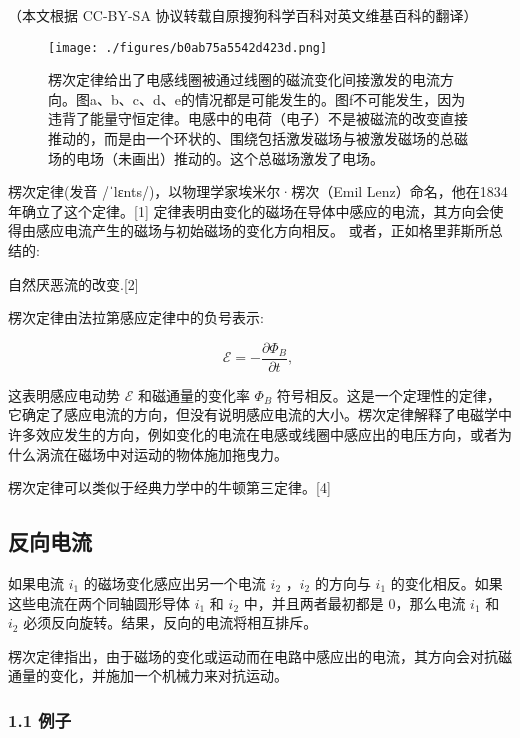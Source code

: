 
（本文根据 CC-BY-SA 协议转载自原搜狗科学百科对英文维基百科的翻译）

\begin{figure}[ht]
\centering
\texttt{[image: ./figures/b0ab75a5542d423d.png]}
\caption{楞次定律给出了电感线圈被通过线圈的磁流变化间接激发的电流方向。图a、b、c、d、e的情况都是可能发生的。图f不可能发生，因为违背了能量守恒定律。电感中的电荷（电子）不是被磁流的改变直接推动的，而是由一个环状的、围绕包括激发磁场与被激发磁场的总磁场的电场（未画出）推动的。这个总磁场激发了电场。} \label{fig_LCDL_1}
\end{figure}

楞次定律(发音 /ˈlɛnts/)，以物理学家埃米尔·楞次（Emil Lenz）命名，他在1834年确立了这个定律。[1] 定律表明由变化的磁场在导体中感应的电流，其方向会使得由感应电流产生的磁场与初始磁场的变化方向相反。 或者，正如格里菲斯所总结的:

自然厌恶流的改变.[2]

楞次定律由法拉第感应定律中的负号表示:

\begin{equation}
\mathcal{E} = -\frac{\partial \Phi_B}{\partial t},~
\end{equation}

这表明感应电动势 $\mathcal{E}$ 和磁通量的变化率 $\Phi_B$ 符号相反。这是一个定理性的定律，它确定了感应电流的方向，但没有说明感应电流的大小。楞次定律解释了电磁学中许多效应发生的方向，例如变化的电流在电感或线圈中感应出的电压方向，或者为什么涡流在磁场中对运动的物体施加拖曳力。

楞次定律可以类似于经典力学中的牛顿第三定律。[4]

\subsection{反向电流}

如果电流 $i_1$ 的磁场变化感应出另一个电流 $i_2$ ，$i_2$ 的方向与 $i_1$ 的变化相反。如果这些电流在两个同轴圆形导体 $i_1$ 和 $i_2$ 中，并且两者最初都是 0，那么电流 $i_1$ 和 $i_2$ 必须反向旋转。结果，反向的电流将相互排斥。

楞次定律指出，由于磁场的变化或运动而在电路中感应出的电流，其方向会对抗磁通量的变化，并施加一个机械力来对抗运动。

\subsubsection{1.1 例子}

